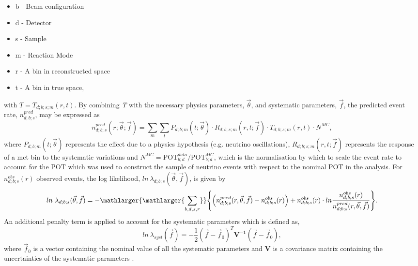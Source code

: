 \begin{itemize}
    \item b - Beam configuration
    \item d - Detector
    \item s - Sample
    \item m - Reaction Mode
    \item r - A bin in reconstructed space
    \item t - A bin in true space, 
\end{itemize}
with $T = T_{d;b;s;m}(r, t)$. By combining \textit{T} with the necessary physics parameters, $\vec{\theta}$, and systematic parameters, $\vec{f}$, the predicted event rate, $n^{pred}_{d;b;s}$, may be expressed as
\begin{equation}
n_{d;b;s}^{pred}(r; \vec{\theta}; \vec{f}) =
   \sum_{m} \sum_{t}  P_{d;b;m}(t; \vec{\theta}) \cdot R_{d;b;s;m}(r,t; \vec{f}) \cdot T_{d;b;s;m}(r,t) \cdot N^{MC},
   \label{eq:valor_npred}
\end{equation}
where $P_{d;b;m}(t; \vec{\theta})$ represents the effect due to a physics hypothesis (e.g. neutrino oscillations), $R_{d;b;s;m}(r,t; \vec{f})$ represents the response of a \gls{mct} bin to the systematic variations and $N^{MC} = \mbox{POT}_{b;d}^{data}/\mbox{POT}_{b;d}^{MC}$, which is the normalisation by which to scale the event rate to account for the POT which was used to construct the sample of neutrino events with respect to the nominal POT in the analysis. For $n_{d ; b ; s}^{obs}(r)$ observed events, the log likelihood, $ln~\lambda_{d;b;s}(\vec \theta, \vec f)$, is given by
\begin{equation}
    ln~\lambda_{d;b;s}(\vec \theta, \vec f) = - \mathlarger{\mathlarger{\sum_{b,d,s,r}}} \Bigg \{ \Big (n_{d;b;s}^{pred}(r,\vec{\theta},\vec{f})
    - n_{d ; b ; s}^{obs}(r) \Big) + n_{d ; b ; s}^{obs}(r) \cdot ln \frac{n_{d ; b ; s}^{obs}(r)}{n_{d ; b ; s}^{p r e d}(r , \vec{\theta} , \vec{f})} \Bigg \}.
\end{equation}
An additional penalty term is applied to account for the systematic parameters which is defined as,
\begin{equation}
    ln~\lambda_{syst}(\vec{f}) = -\frac{1}{2} (\vec{f} - \vec{f}_0)^T \mathbf{V^{-1}} (\vec{f} - \vec{f}_0),
\end{equation}
where $\vec{f}_0$ is a vector containing the nominal value of all the systematic parameters and \textbf{V} is a covariance matrix containing the uncertainties of the systematic parameters \cite{VALOR_dune}. 

